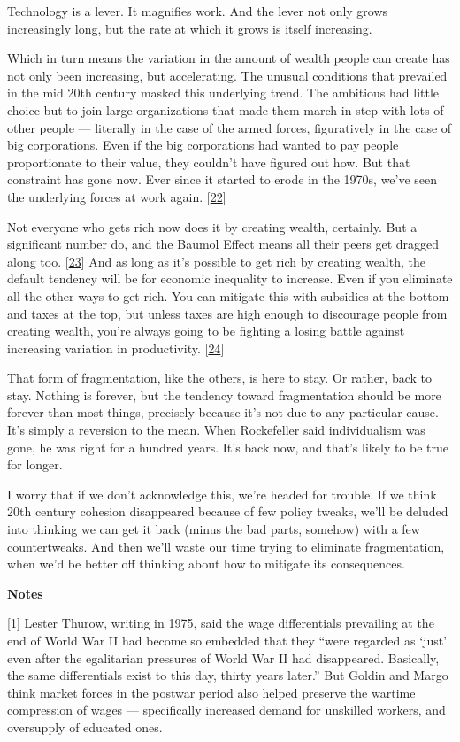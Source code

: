 Technology is a lever. It magnifies work. And the lever not only grows
increasingly long, but the rate at which it grows is itself increasing.

Which in turn means the variation in the amount of wealth people can
create has not only been increasing, but accelerating. The unusual
conditions that prevailed in the mid 20th century masked this underlying
trend. The ambitious had little choice but to join large organizations
that made them march in step with lots of other people --- literally in
the case of the armed forces, figuratively in the case of big
corporations. Even if the big corporations had wanted to pay people
proportionate to their value, they couldn't have figured out how. But
that constraint has gone now. Ever since it started to erode in the
1970s, we've seen the underlying forces at work again.
{[}\hyperref[f22n]{22}{]}

Not everyone who gets rich now does it by creating wealth, certainly.
But a significant number do, and the Baumol Effect means all their peers
get dragged along too. {[}\hyperref[f23n]{23}{]} And as long as it's
possible to get rich by creating wealth, the default tendency will be
for economic inequality to increase. Even if you eliminate all the other
ways to get rich. You can mitigate this with subsidies at the bottom and
taxes at the top, but unless taxes are high enough to discourage people
from creating wealth, you're always going to be fighting a losing battle
against increasing variation in productivity. {[}\hyperref[f24n]{24}{]}

That form of fragmentation, like the others, is here to stay. Or rather,
back to stay. Nothing is forever, but the tendency toward fragmentation
should be more forever than most things, precisely because it's not due
to any particular cause. It's simply a reversion to the mean. When
Rockefeller said individualism was gone, he was right for a hundred
years. It's back now, and that's likely to be true for longer.

I worry that if we don't acknowledge this, we're headed for trouble. If
we think 20th century cohesion disappeared because of few policy tweaks,
we'll be deluded into thinking we can get it back (minus the bad parts,
somehow) with a few countertweaks. And then we'll waste our time trying
to eliminate fragmentation, when we'd be better off thinking about how
to mitigate its consequences.

\textbf{Notes}

{[}1{]} Lester Thurow, writing in 1975, said the wage differentials
prevailing at the end of World War II had become so embedded that they
``were regarded as `just' even after the egalitarian pressures of World
War II had disappeared. Basically, the same differentials exist to this
day, thirty years later.'' But Goldin and Margo think market forces in
the postwar period also helped preserve the wartime compression of wages
--- specifically increased demand for unskilled workers, and oversupply
of educated ones.

